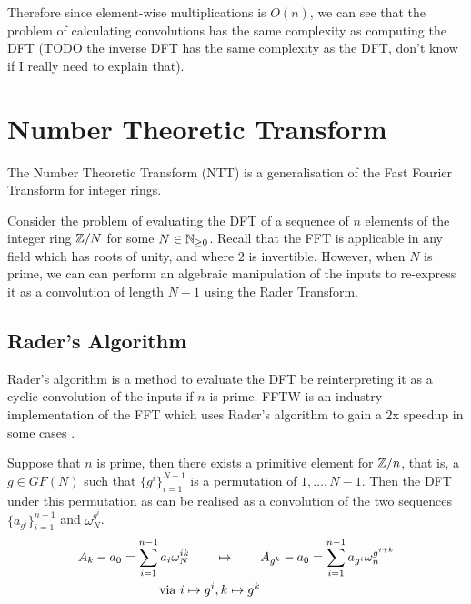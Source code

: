 Therefore since element-wise multiplications is $O(n)$, we can see that the problem of calculating convolutions has the same complexity as computing the DFT (TODO the inverse DFT has the same complexity as the DFT, don't know if I really need to explain that).

\section{Number Theoretic Transform}
\label{sec:ntt}

The Number Theoretic Transform (NTT) is a generalisation of the Fast Fourier Transform for integer rings.

Consider the problem of evaluating the DFT of a sequence of $n$ elements of the integer ring ${\mathbb Z}/N$ for some $N \in {\mathbb N}_{\ge 0}$. Recall that the FFT is applicable in any field which has roots of unity, and where $2$ is invertible. However, when $N$ is prime, we can can perform an algebraic manipulation of the inputs to re-express it as a convolution of length $N-1$ using the Rader Transform.

\subsection{Rader's Algorithm}
\label{subsec:rt}

Rader's algorithm is a method to evaluate the DFT be reinterpreting it as a cyclic convolution of the inputs if $n$ is prime. FFTW is an industry implementation of the FFT which uses Rader's algorithm to gain a $2$x speedup in some cases \cite{fftw}.

\begin{theorem}\label{thm:rader-transform}
    Suppose that $n$ is prime, then there exists a primitive element for ${\mathbb Z}/n$, that is, a $g \in GF(N)$ such that $\{g^i\}_{i=1}^{N-1}$ is a permutation of $1, \ldots, N-1$. Then the DFT under this permutation as can be realised as a convolution of the two sequences $\{a_{g^i}\}_{i=1}^{n-1}$ and $\omega_N^{g^i}$.
    \begin{align*}
        A_k - a_0 = \sum^{n-1}_{i=1} a_i \omega_N^{ik} \qquad &\mapsto \qquad A_{g^k} - a_0 = \sum^{n-1}_{i=1} a_{g^i}\omega_n^{g^{i+k}}\\
        \textrm{ via } i \mapsto g^i&, k \mapsto g^k
    \end{align*}
\end{theorem}

